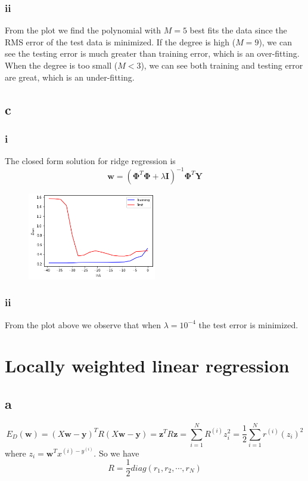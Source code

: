 \documentclass{article}
\begin{document}
\subsubsection*{ii}
From the plot we find the polynomial with $M = 5$ best fits the data since the RMS error of the test data is minimized. If the degree is high ($M = 9$), we can see the testing error is much greater than training error, which is an over-fitting. When the degree is too small ($M < 3$), we can see both training and testing error are great, which is an under-fitting.

\newpage

\subsection*{c}
\subsubsection*{i}
The closed form solution for ridge regression is
$$\mathbf{w} = (\mathbf{\Phi}^T\mathbf{\Phi} + \lambda\mathbf{I})^{-1}\mathbf{\Phi}^T\mathbf{Y}$$

\begin{figure}[htbp]
    \centering
    \includegraphics[width=0.5\textwidth]{1ci.png}
\end{figure}

\subsubsection*{ii}
From the plot above we observe that when $\lambda = 10^{-4}$ the test error is minimized.

\newpage

\section{Locally weighted linear regression}

\subsection*{a}
$$E_D(\mathbf{w}) = (X\mathbf{w} - \mathbf{y})^TR(X\mathbf{w} - \mathbf{y}) = \mathbf{z}^T R \mathbf{z} = \sum_{i=1}^{N} R^{(i)}z_i^2 = \frac{1}{2}\sum_{i=1}^{N} r^{(i)}(z_i)^2$$
where $z_i = \mathbf{w}^Tx^{(i)-y^{(i)}}$. So we have
$$R = \frac{1}{2} diag(r_1, r_2, \cdots, r_N)$$
\end{document}
